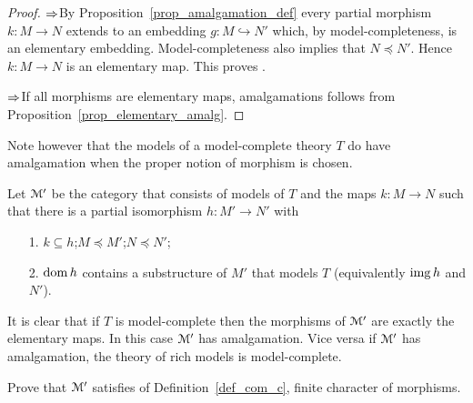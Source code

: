\begin{proof}
$\Rightarrow$\quad By Proposition~\ref{prop_amalgamation_def} every partial morphism $k:M\to N$ extends to an embedding $g : M\hookrightarrow N'$ which, by model-completeness, is an elementary embedding. Model-completeness also implies that $N\preceq N'$. Hence $k:M\to N$ is an elementary map. This proves .

$\Rightarrow$\quad If all morphisms are elementary maps, amalgamations follows from Proposition~\ref{prop_elementary_amalg}.
\end{proof}

Note however that the models of a model-complete theory $T$ do have amalgamation when the proper notion of morphism is chosen. 

Let $\EuScript M'$ be the category that consists of models of $T$ and the maps $k:M\to N$ such that there is a  partial isomorphism $h:M'\to N'$ with 
\begin{itemize}
\item[1.] $k\subseteq h$;\quad $M\preceq M'$;\quad  $N\preceq N'$;

\item[2.] $\mathop{\rm dom} h$ contains a substructure of $M'$ that models $T$ (equivalently $\mathop{\rm img} h$ and $N'$).
\end{itemize}

It is clear that if $T$ is model-complete then the morphisms of $\EuScript M'$ are exactly the elementary maps. In this case $\EuScript M'$ has amalgamation. Vice versa if $\EuScript M'$ has amalgamation, the theory of rich models is model-complete.

\begin{exercise}
Prove that $\EuScript M'$ satisfies  of Definition~\ref{def_com_c}, finite character of morphisms.\QED
\end{exercise}








